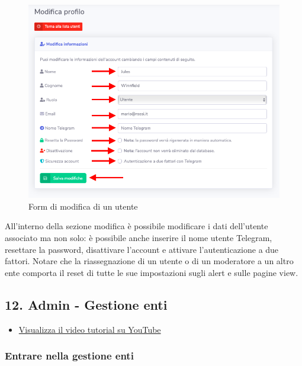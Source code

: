 		\begin{figure}[H]
		\centering
		\includegraphics[scale=0.600]{res/images/admin/modUtente.png}
		\caption{Form di modifica di un utente}
	\end{figure}
	All'interno della sezione modifica è possibile modificare i dati dell'utente associato ma non solo: è possibile anche inserire il nome utente Telegram, resettare la password, disattivare l'account e attivare l'autenticazione a due fattori.
	Notare che la riassegnazione di un utente o di un moderatore a un altro ente comporta il reset di tutte le sue impostazioni sugli alert e sulle pagine view.

\newpage \subsection{12. Admin - Gestione enti}

	\begin{itemize}
		\item \href{https://www.youtube.com/watch?v=PjySMOLCtMA&list=PLPKYjnuIh1FA3b3jn_bwY_ztYzaFn2mIT&index=15}{Visualizza il video tutorial su YouTube} 
	\end{itemize}
	
	\subsubsection{Entrare nella gestione enti}

